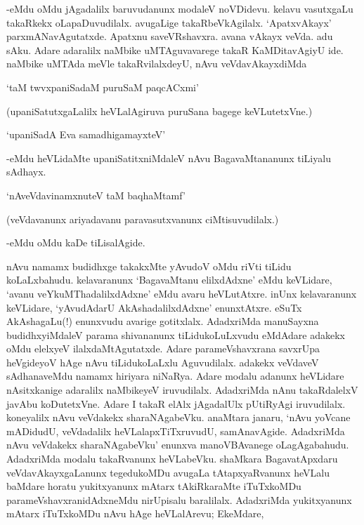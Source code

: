 -eMdu oMdu jAgadalilx baruvudanunx modaleV noVDidevu. kelavu vasutxgaLu takaRkekx oLapaDuvudilalx. avugaLige takaRbeVkAgilalx. `ApatxvAkayx' parxmANavAgutatxde. Apatxnu saveVRshavxra. avana vAkayx veVda. adu sAku. Adare adaralilx naMbike uMTAguvavarege takaR KaMDitavAgiyU ide. naMbike uMTAda meVle takaRvilalxdeyU, nAvu veVdavAkayxdiMda

\begin{shloka}
`taM twvxpaniSadaM puruSaM paqcACxmi'
\end{shloka}

(upaniSatutxgaLalilx heVLalAgiruva puruSana bagege keVLutetxVne.)

\begin{shloka}
`upaniSadA Eva samadhigamayxteV'
\end{shloka}

-eMdu heVLidaMte upaniSatitxniMdaleV nAvu BagavaMtananunx tiLiyalu sAdhayx.

\begin{shloka}
`nAveVdavinamxnuteV taM baqhaMtamf'
\end{shloka}

(veVdavanunx ariyadavanu paravasutxvanunx ciMtisuvudilalx.)

-eMdu oMdu kaDe tiLisalAgide.

nAvu namamx budidhxge takakxMte yAvudoV oMdu riVti tiLidu koLaLxbahudu. kelavaranunx `BagavaMtanu elilxdAdxne' eMdu keVLidare, `avanu veYkuMThadalilxdAdxne' eMdu avaru heVLutAtxre. inUnx kelavaranunx keVLidare, `yAvudAdarU AkAshadalilxdAdxne' enunxtAtxre. eSuTx AkAshagaLu(!) enunxvudu avarige gotitxlalx. AdadxriMda manuSayxna budidhxyiMdaleV parama shivananunx tiLidukoLuLxvudu eMdAdare adakekx oMdu elelxyeV ilalxdaMtAgutatxde. Adare parameVshavxrana savxrUpa heVgideyoV hAge nAvu tiLidukoLaLxlu Aguvudilalx. adakekx veVdaveV sAdhanaveMdu namamx hiriyara niNaRya. Adare modalu adanunx heVLidare nAsitxkanige adaralilx naMbikeyeV iruvudilalx. AdadxriMda nAnu takaRdalelxV javAbu koDutetxVne. Adare I takaR elAlx jAgadalUlx pUtiRyAgi iruvudilalx. koneyalilx nAvu veVdakekx sharaNAgabeVku. anaMtara janaru, `nAvu yoVcane mADidudU, veVdadalilx heVLalapxTiTxruvudU, samAnavAgide. AdadxriMda nAvu veVdakekx sharaNAgabeVku' enunxva manoVBAvanege oLagAgabahudu. AdadxriMda modalu takaRvanunx heVLabeVku. shaMkara BagavatApxdaru veVdavAkayxgaLanunx tegedukoMDu avugaLa tAtapxyaRvanunx heVLalu baMdare horatu yukitxyanunx mAtarx tAkiRkaraMte iTuTxkoMDu parameVshavxranidAdxneMdu nirUpisalu baralilalx. AdadxriMda yukitxyanunx mAtarx iTuTxkoMDu nAvu hAge heVLalArevu; EkeMdare, 


